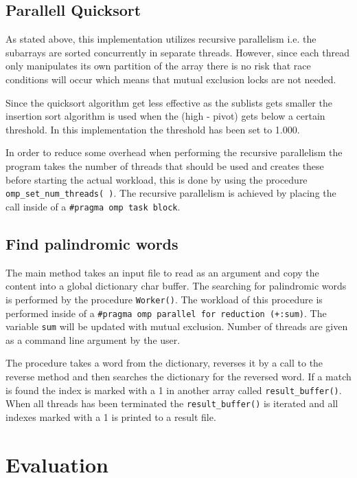 \documentclass{article}
\begin{document}
\subsection{Parallell Quicksort}

As stated above, this implementation utilizes recursive parallelism i.e. the subarrays are sorted concurrently in separate threads. However, since each thread only manipulates its own partition of the array there is no risk that race conditions will occur which means that mutual exclusion locks are not needed.

Since the quicksort algorithm get less effective as the sublists gets smaller the insertion sort algorithm is used when the (high - pivot) gets below a certain threshold. In this implementation the threshold has been set to 1.000. 

In order to reduce some overhead when performing the recursive parallelism the program takes the number of threads that should be used and creates these before starting the actual workload, this is done by using the procedure \texttt{omp\_set\_num\_threads( )}.
The recursive parallelism is achieved by placing the call inside of a \texttt{#pragma omp task block}. 

\subsection{ Find palindromic words}
The main method takes an input file to read as an argument and copy the content into a global dictionary char buffer. The searching for palindromic words is performed by the procedure \texttt{Worker()}. The workload of this procedure is performed inside of a \texttt{#pragma omp parallel for reduction (+:sum)}. The variable \texttt{sum} will be updated with mutual exclusion. Number of threads are given as a command line argument by the user. 

The procedure takes a word from the dictionary, reverses it by a call to the reverse method and then searches the dictionary for the reversed word. If a match is found the index is marked with a 1 in another array called  \texttt{result\_buffer()}. When all threads has been terminated the \texttt{result\_buffer()} is iterated and all indexes marked with a 1 is printed to a result file. 



\clearpage
\section{Evaluation}
\end{document}
